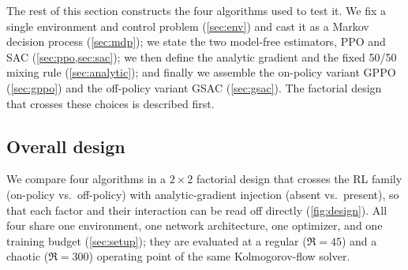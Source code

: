 The rest of this section constructs the four algorithms used to test it. We
fix a single environment and control problem (\cref{sec:env}) and cast it as
a Markov decision process (\cref{sec:mdp}); we state the two model-free
estimators, PPO and SAC (\cref{sec:ppo,sec:sac}); we then define the analytic
gradient and the fixed 50/50 mixing rule (\cref{sec:analytic}); and finally
we assemble the on-policy variant GPPO (\cref{sec:gppo}) and the off-policy
variant GSAC (\cref{sec:gsac}). The factorial design that crosses these
choices is described first.

\subsection{Overall design}
\label{sec:design}

We compare four algorithms in a $2\times 2$ factorial design that crosses the
RL family (on-policy vs.\ off-policy) with analytic-gradient injection
(absent vs.\ present), so that each factor and their interaction can be read
off directly (\cref{fig:design}). All four share one environment, one network
architecture, one optimizer, and one training budget (\cref{sec:setup}); they
are evaluated at a regular ($\Re=45$) and a chaotic ($\Re=300$) operating
point of the same Kolmogorov-flow solver.

